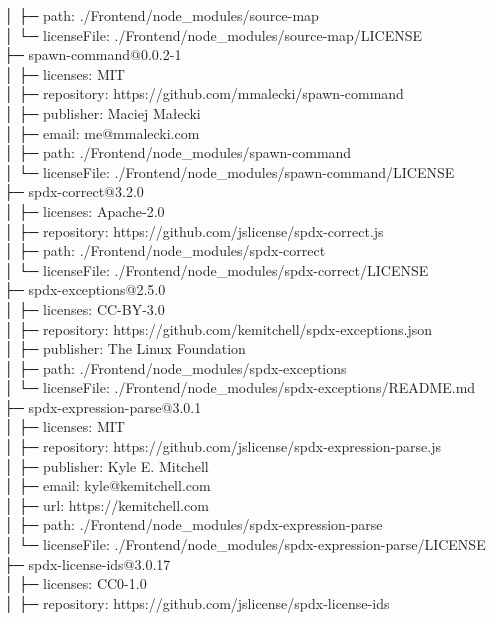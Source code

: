 │  ├─ path: ./Frontend/node\_modules/source-map\\
│  └─ licenseFile: ./Frontend/node\_modules/source-map/LICENSE\\
├─ spawn-command@0.0.2-1\\
│  ├─ licenses: MIT\\
│  ├─ repository: https://github.com/mmalecki/spawn-command\\
│  ├─ publisher: Maciej Małecki\\
│  ├─ email: me@mmalecki.com\\
│  ├─ path: ./Frontend/node\_modules/spawn-command\\
│  └─ licenseFile: ./Frontend/node\_modules/spawn-command/LICENSE\\
├─ spdx-correct@3.2.0\\
│  ├─ licenses: Apache-2.0\\
│  ├─ repository: https://github.com/jslicense/spdx-correct.js\\
│  ├─ path: ./Frontend/node\_modules/spdx-correct\\
│  └─ licenseFile: ./Frontend/node\_modules/spdx-correct/LICENSE\\
├─ spdx-exceptions@2.5.0\\
│  ├─ licenses: CC-BY-3.0\\
│  ├─ repository: https://github.com/kemitchell/spdx-exceptions.json\\
│  ├─ publisher: The Linux Foundation\\
│  ├─ path: ./Frontend/node\_modules/spdx-exceptions\\
│  └─ licenseFile: ./Frontend/node\_modules/spdx-exceptions/README.md\\
├─ spdx-expression-parse@3.0.1\\
│  ├─ licenses: MIT\\
│  ├─ repository: https://github.com/jslicense/spdx-expression-parse.js\\
│  ├─ publisher: Kyle E. Mitchell\\
│  ├─ email: kyle@kemitchell.com\\
│  ├─ url: https://kemitchell.com\\
│  ├─ path: ./Frontend/node\_modules/spdx-expression-parse\\
│  └─ licenseFile: ./Frontend/node\_modules/spdx-expression-parse/LICENSE\\
├─ spdx-license-ids@3.0.17\\
│  ├─ licenses: CC0-1.0\\
│  ├─ repository: https://github.com/jslicense/spdx-license-ids\\
